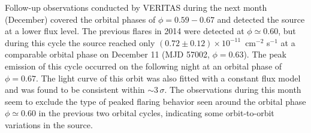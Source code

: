 \documentclass[preprint2]{aastex}
\newcommand{\pflux}{~cm$^{-2}$ s$^{-1}$}
\begin{document}

Follow-up observations conducted by VERITAS during the next month (December) covered the orbital phases of $\phi=0.59-0.67$ and detected the source at a lower flux level. The previous flares in 2014 were detected at $\phi \simeq 0.60$, but during this cycle the source reached only $(0.72 \pm 0.12) \times10^{-11}$\pflux{} at a comparable orbital phase on December 11 (MJD 57002, $\phi=0.63$). The peak emission of this cycle occurred on the following night at an orbital phase of $\phi=0.67$. The light curve of this orbit was also fitted with a constant flux model and was found to be consistent within $\sim3\,\sigma$. The observations during this month seem to exclude the type of peaked flaring behavior seen around the orbital phase $\phi \simeq 0.60$ in the previous two orbital cycles, indicating some orbit-to-orbit variations in the source.
\end{document}
